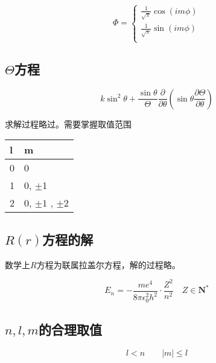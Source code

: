\begin{equation*}
    \Phi = \begin{cases}
        \frac{1}{\sqrt{\pi}} \cos(im\phi) \\
        \frac{1}{\sqrt{\pi}} \sin(im\phi) \\
    \end{cases}
\end{equation*}


\subsection{$\Theta$方程}

\begin{equation*}
    k \sin ^2 \theta  + \frac{\sin \theta}{\Theta}   \frac{\partial}{\partial \theta} \left( \sin \theta \frac{\partial \Theta}{\partial \theta} \right)
\end{equation*}

求解过程略过。需要掌握取值范围

\begin{table}[H]
    \centering
    \begin{tabular}{ll}
        \toprule
        l & m \\
        \midrule
        0 & 0 \\
        1 & 0, $\pm$1 \\ 
        2 & 0, $\pm 1$ , $\pm 2$ \\ 
        \bottomrule
    \end{tabular}
\end{table}


\subsection{$R(r)$方程的解}

数学上$R$方程为联属拉盖尔方程，解的过程略。

\begin{equation*}
    E_n = - \frac{me^4}{8 \pi \epsilon_0^2 h^2}  \cdot \frac{Z^2}{n^2} \quad Z \in \mathbf{N} ^{*}
\end{equation*}

\subsection{$n,l,m$的合理取值}

\begin{equation*}
    l < n \qquad \left\lvert m \right\rvert \le l
\end{equation*}
